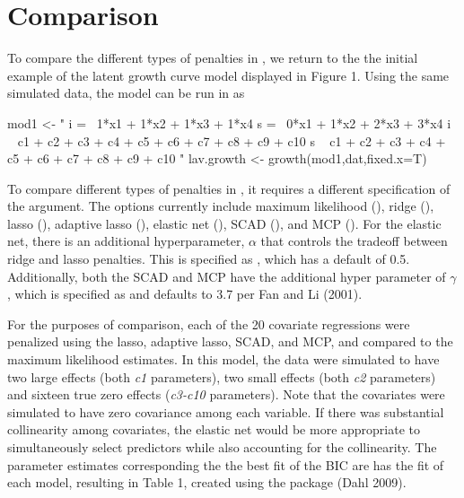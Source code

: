 \documentclass[article]{jss}
\begin{document}
\section{Comparison}\label{comparison}

To compare the different types of penalties in , we return
to the the initial example of the latent growth curve model displayed in
Figure 1. Using the same simulated data, the model can be run in
 as

\begin{CodeChunk}
\begin{CodeInput}
mod1 <- "
i =~ 1*x1 + 1*x2 + 1*x3 + 1*x4
s =~ 0*x1 + 1*x2 + 2*x3 + 3*x4
i ~ c1 + c2 + c3 + c4 + c5 + c6 + c7 + c8 + c9 + c10
s ~ c1 + c2 + c3 + c4 + c5 + c6 + c7 + c8 + c9 + c10
"
lav.growth <- growth(mod1,dat,fixed.x=T)
\end{CodeInput}
\end{CodeChunk}

To compare different types of penalties in , it requires a
different specification of the  argument. The options
currently include maximum likelihood (), ridge
(), lasso (), adaptive lasso
(), elastic net (), SCAD (),
and MCP (). For the elastic net, there is an additional
hyperparameter, \(\alpha\) that controls the tradeoff between ridge and
lasso penalties. This is specified as  , which has a
default of 0.5. Additionally, both the SCAD and MCP have the additional
hyper parameter of \(\gamma\), which is specified as  and
defaults to 3.7 per Fan and Li (2001).

For the purposes of comparison, each of the 20 covariate regressions
were penalized using the lasso, adaptive lasso, SCAD, and MCP, and
compared to the maximum likelihood estimates. In this model, the data
were simulated to have two large effects (both \textit{c1} parameters),
two small effects (both \textit{c2} parameters) and sixteen true zero
effects (\textit{c3-c10} parameters). Note that the covariates were
simulated to have zero covariance among each variable. If there was
substantial collinearity among covariates, the elastic net would be more
appropriate to simultaneously select predictors while also accounting
for the collinearity. The parameter estimates corresponding the the best
fit of the BIC are has the fit of each model, resulting in Table 1,
created using the  package (Dahl 2009).
\end{document}
